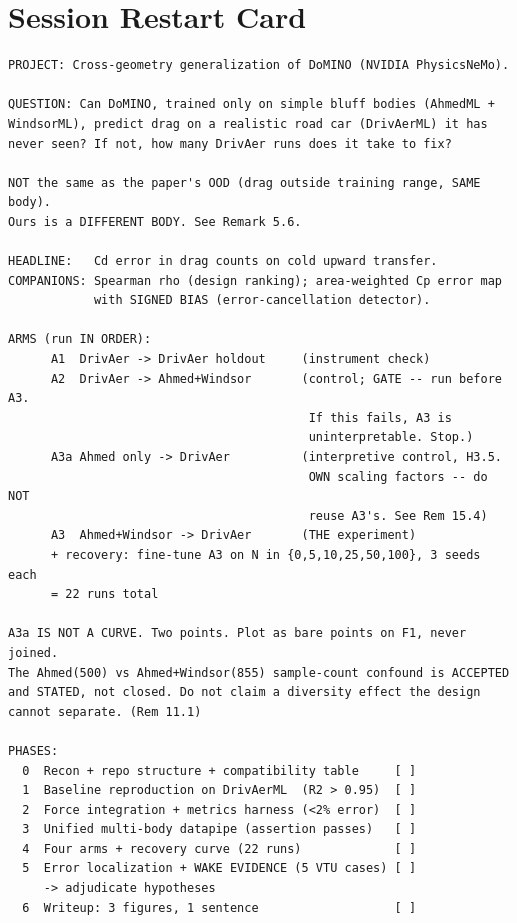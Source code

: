 \documentclass[10pt,a4paper]{article}
\theoremstyle{definition}
\begin{document}
\section{Session Restart Card}
\label{sec:restart}

\begin{lstlisting}[style=sh]
PROJECT: Cross-geometry generalization of DoMINO (NVIDIA PhysicsNeMo).

QUESTION: Can DoMINO, trained only on simple bluff bodies (AhmedML +
WindsorML), predict drag on a realistic road car (DrivAerML) it has
never seen? If not, how many DrivAer runs does it take to fix?

NOT the same as the paper's OOD (drag outside training range, SAME body).
Ours is a DIFFERENT BODY. See Remark 5.6.

HEADLINE:   Cd error in drag counts on cold upward transfer.
COMPANIONS: Spearman rho (design ranking); area-weighted Cp error map
            with SIGNED BIAS (error-cancellation detector).

ARMS (run IN ORDER):
      A1  DrivAer -> DrivAer holdout     (instrument check)
      A2  DrivAer -> Ahmed+Windsor       (control; GATE -- run before A3.
                                          If this fails, A3 is
                                          uninterpretable. Stop.)
      A3a Ahmed only -> DrivAer          (interpretive control, H3.5.
                                          OWN scaling factors -- do NOT
                                          reuse A3's. See Rem 15.4)
      A3  Ahmed+Windsor -> DrivAer       (THE experiment)
      + recovery: fine-tune A3 on N in {0,5,10,25,50,100}, 3 seeds each
      = 22 runs total

A3a IS NOT A CURVE. Two points. Plot as bare points on F1, never joined.
The Ahmed(500) vs Ahmed+Windsor(855) sample-count confound is ACCEPTED
and STATED, not closed. Do not claim a diversity effect the design
cannot separate. (Rem 11.1)

PHASES:
  0  Recon + repo structure + compatibility table     [ ]
  1  Baseline reproduction on DrivAerML  (R2 > 0.95)  [ ]
  2  Force integration + metrics harness (<2% error)  [ ]
  3  Unified multi-body datapipe (assertion passes)   [ ]
  4  Four arms + recovery curve (22 runs)             [ ]
  5  Error localization + WAKE EVIDENCE (5 VTU cases) [ ]
     -> adjudicate hypotheses
  6  Writeup: 3 figures, 1 sentence                   [ ]


\end{lstlisting}
\end{document}
